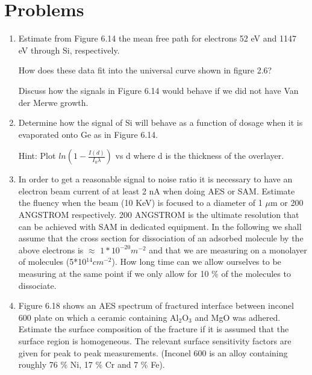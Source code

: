           \section{Problems}
             \begin{enumerate}


             \item Estimate from Figure 6.14 the mean free path for
          electrons 52 eV and 1147 eV through Si, respectively.

             How does these data fit into the universal curve shown in
          figure 2.6?


             Discuss how the signals in Figure 6.14 would behave
          if we did not have  Van der Merwe growth.

             \item Determine how the signal of Si  will  behave  as  a
          function of dosage when it  is  evaporated  onto  Ge  as  in
          Figure 6.14.

             Hint: Plot $ln(1-\frac{I(d)}{I_{0}\lambda})$ vs d where d
          is the thickness of the overlayer.





             \item In order to get a reasonable signal to noise ratio
          it is necessary to have an electron beam current of at least
          2 nA when doing AES or SAM. Estimate the fluency when the
          beam (10 KeV) is focused to a diameter of 1 $\mu$m or 200 ANGSTROM
          respectively. 200 ANGSTROM is the ultimate resolution that can be
          achieved with SAM in dedicated equipment. In the following
          we shall assume that the cross section for dissociation of
          an adsorbed molecule by the above electrons is $\approx$
          $1*10^{-20} m^{-2}$ and that we are measuring on a monolayer
          of molecules (5*10$^{14} cm^{-2}$). How long time can we
          allow ourselves to be measuring at the same point if we only
          allow for 10 \% of the molecules to dissociate. 


             \item Figure 6.18 shows an AES spectrum of fractured
          interface between inconel 600 plate on which a ceramic
          containing Al$_{2}$O$_{3}$ and MgO was adhered. Estimate
          the surface composition of the fracture if it is assumed
          that the surface region is homogeneous. The relevant surface
          sensitivity factors are given for peak to peak measurements.
          (Inconel 600 is an alloy containing roughly 76 \% Ni, 17  \%
          Cr and 7 \% Fe).

                       \newpage

                       \vspace*{13cm}






\end{enumerate}


